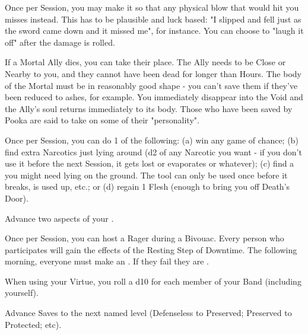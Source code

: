 \begin{multicols*}{2}
Once per Session, you may make it so that any physical blow that would hit you misses instead.  This has to be plausible and luck based: "I slipped and fell just as the sword came down and it missed me", for instance.  You can choose to "laugh it off" after the damage is rolled.


If a Mortal Ally dies, you can take their place.  The Ally needs to be Close or Nearby to you, and they cannot have been dead for longer than Hours.  The body of the Mortal must be in reasonably good shape - you can't save them if they've been reduced to ashes, for example.  You immediately disappear into the Void and the Ally's soul returns immediately to its body. Those who have been saved by Pooka are said to take on some of their "personality".

\cbreak


 Once per Session, you can do 1 of the following:  (a) win any game of chance; (b) find extra Narcotics just lying around (d2 \UD of any Narcotic you want - if you don't use it before the next Session, it gets lost or evaporates or whatever); (c) find a  you might need lying on the ground. The tool can only be used once before it breaks, is used up, etc.; or (d) regain 1 Flesh (enough to bring you off Death's Door).




Advance two  aspects of your  \DCUP.


Once per Session, you can host a Rager during a Bivouac.  Every person who participates will gain the effects of the Resting Step of Downtime. The following morning, everyone must make an \RSTRY{\VIG}. If they fail they are .

\newpage


When using your  Virtue, you roll a d10 for each member of your Band (including yourself).


Advance  Saves to the next named level (Defenseless to Preserved; Preserved to Protected; etc).


\end{multicols*}
